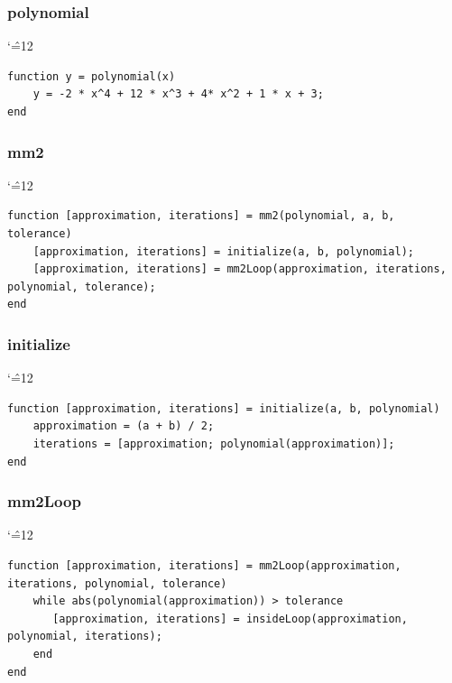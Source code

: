 \documentclass[12pt]{report}
\newenvironment{simplechar}{%
   \catcode`\^=12
}{}
\begin{document}
\subsubsection{polynomial}
\begin{simplechar}
\begin{lstlisting}
function y = polynomial(x)
    y = -2 * x^4 + 12 * x^3 + 4* x^2 + 1 * x + 3;
end

\end{lstlisting}
\end{simplechar}

\subsubsection{mm2}
\begin{simplechar}
\begin{lstlisting}
function [approximation, iterations] = mm2(polynomial, a, b, tolerance)
    [approximation, iterations] = initialize(a, b, polynomial);
    [approximation, iterations] = mm2Loop(approximation, iterations, polynomial, tolerance);
end
\end{lstlisting}
\end{simplechar}

\subsubsection{initialize}
\begin{simplechar}
\begin{lstlisting}
function [approximation, iterations] = initialize(a, b, polynomial)
    approximation = (a + b) / 2;
    iterations = [approximation; polynomial(approximation)];
end

\end{lstlisting}
\end{simplechar}

\subsubsection{mm2Loop}
\begin{simplechar}
\begin{lstlisting}
function [approximation, iterations] = mm2Loop(approximation, iterations, polynomial, tolerance)
    while abs(polynomial(approximation)) > tolerance
       [approximation, iterations] = insideLoop(approximation, polynomial, iterations);
    end
end
\end{lstlisting}
\end{simplechar}
\end{document}

